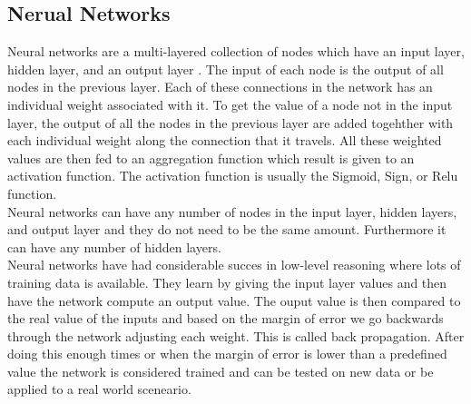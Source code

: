 \subsection{Nerual Networks}
Neural networks are a multi-layered collection of nodes which have an input layer, hidden layer, and an output layer \cite{AI-book}.
The input of each node is the output of all nodes in the previous layer.
Each of these connections in the network has an individual weight associated with it.
To get the value of a node not in the input layer, the output of all the nodes in the previous layer are added togehther with each individual weight along the connection that it travels.
All these weighted values are then fed to an aggregation function which result is given to an activation function.
The activation function is usually the Sigmoid, Sign, or Relu function.
\\
Neural networks can have any number of nodes in the input layer, hidden layers, and output layer and they do not need to be the same amount.
Furthermore it can have any number of hidden layers.
\\
Neural networks have had considerable succes in low-level reasoning where lots of training data is available.
They learn by giving the input layer values and then have the network compute an output value.
The ouput value is then compared to the real value of the inputs and based on the margin of error we go backwards through the network adjusting each weight.
This is called back propagation.
After doing this enough times or when the margin of error is lower than a predefined value the network is considered trained and can be tested on new data or be applied to a real world sceneario.
